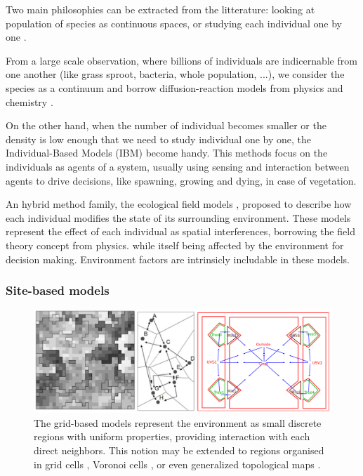 

Two main philosophies can be extracted from the litterature: looking at population of species as continuous spaces, or studying each individual one by one \cite{Czaran1998}.

From a large scale observation, where billions of individuals are indicernable from one another (like grass sproot, bacteria, whole population, ...), we consider the species as a continuum and borrow diffusion-reaction models from physics and chemistry \cite{Turing1952}. 

On the other hand, when the number of individual becomes smaller or the density is low enough that we need to study individual one by one, the Individual-Based Models (IBM) become handy. This methods focus on the individuals as agents of a system, usually using sensing and interaction between agents to drive decisions, like spawning, growing and dying, in case of vegetation.

An hybrid method family, the ecological field models \cite{Wu1985}, proposed to describe how each individual modifies the state of its surrounding environment. These models represent the effect of each individual as spatial interferences, borrowing the field theory concept from physics. while itself being affected by the environment for decision making. Environment factors are intrinsicly includable in these models.

\subsubsection{Site-based models}

\begin{figure}[H]
    \centering
    \includegraphics[width = .8 \linewidth]{grid-based-modeling-teaser.png}
    \caption{The grid-based models represent the environment as small discrete regions with uniform properties, providing interaction with each direct neighbors. This notion may be extended to regions organised in grid cells \cite{Nelson2012}, Voronoi cells \cite{Nelson2012}, or even generalized topological maps \cite{Lemiere2023}. }
    \label{fig:env-obj_grid-based-models}    
\end{figure}

